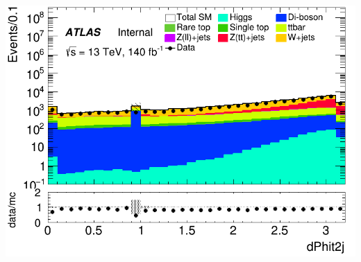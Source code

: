 \documentclass[usenames,dvipsnames]{beamer}
\begin{document}
\begin{frame}
\begin{minipage}{0.32\textwidth}
        \includegraphics[width=\textwidth]{graphics/LH_met/LH_met_dPhit2j.png}
    \end{minipage}
    
    \vspace{0.5cm} %


\end{frame}
\end{document}

